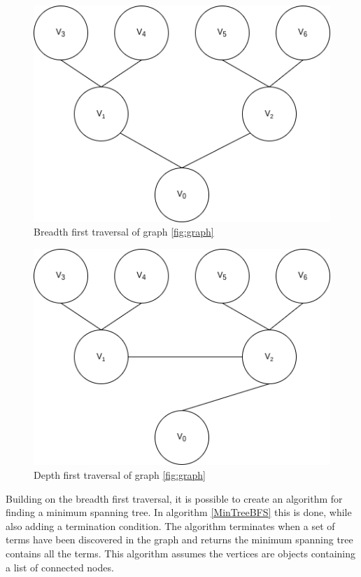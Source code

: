 \begin{figure}[h]
    \centering
    \includegraphics[scale=0.5]{figs/BFT.png}
    \caption{Breadth first traversal of graph \ref{fig:graph}}
    \label{fig:BFT}
\end{figure}

\begin{figure}[h]
    \centering
    \includegraphics[scale=0.5]{figs/DFT.png}
    \caption{Depth first traversal of graph \ref{fig:graph}}
    \label{fig:DFT}
\end{figure}

Building on the breadth first traversal, it is possible to create an algorithm for finding a minimum spanning tree. In algorithm \ref{MinTreeBFS} this is done, while also adding a termination condition. The algorithm terminates when a set of terms have been discovered in the graph and returns the minimum spanning tree contains all the terms. This algorithm assumes the vertices are objects containing a list of connected nodes.

